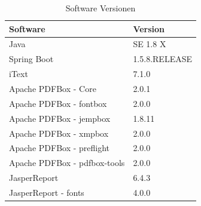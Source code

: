 \documentclass[main.tex]{subfiles}
\begin{document}
\begin{table}[h]
\label{softversion}
\begin{tabular}{ll}
 Software          & Version   \\ \hline
Java        &      SE 1.8   X      \\
Spring Boot &         1.5.8.RELEASE        \\

iText        &        7.1.0  \\
Apache PDFBox - Core &  2.0.1 \\
Apache PDFBox - fontbox & 2.0.0 \\
Apache PDFBox - jempbox & 1.8.11 \\
Apache PDFBox - xmpbox & 2.0.0 \\
Apache PDFBox - preflight & 2.0.0 \\
Apache PDFBox - pdfbox-tools & 2.0.0 \\
JasperReport & 6.4.3 \\
JasperReport - fonts & 4.0.0 \\


\end{tabular}
\caption{Software Versionen}
\end{table}
\end{document}
